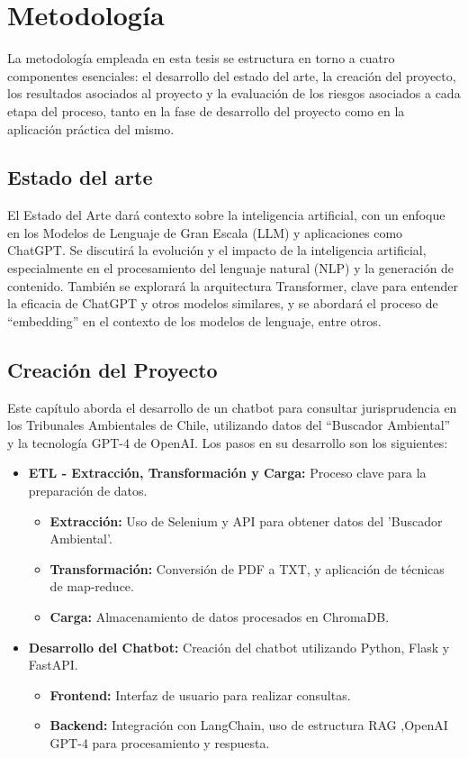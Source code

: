 \section{Metodología}

La metodología empleada en esta tesis se estructura en torno a cuatro componentes esenciales: 
el desarrollo del estado del arte, la creación del proyecto, los resultados asociados al proyecto y la evaluación de los riesgos asociados 
a cada etapa del proceso, tanto en la fase de desarrollo del proyecto como en la aplicación práctica del mismo.

\subsection{Estado del arte}
El Estado del Arte dará contexto sobre la inteligencia artificial, con un enfoque en los Modelos de Lenguaje de Gran Escala (LLM) 
y aplicaciones como ChatGPT. Se discutirá la evolución y el impacto de la inteligencia artificial, especialmente en el procesamiento 
del lenguaje natural (NLP) y la generación de contenido. También se explorará la arquitectura Transformer, clave para entender la 
eficacia de ChatGPT y otros modelos similares, y se abordará el proceso de ``embedding'' en el contexto de los modelos de lenguaje, entre otros.


\subsection{Creación del Proyecto}

Este capítulo aborda el desarrollo de un chatbot para consultar jurisprudencia en los Tribunales Ambientales de Chile, 
utilizando datos del ``Buscador Ambiental'' y la tecnología GPT-4 de OpenAI. Los pasos en su desarrollo son los siguientes:

\begin{itemize}
    \item \textbf{ETL - Extracción, Transformación y Carga:} Proceso clave para la preparación de datos.
    \begin{itemize}
        \item \textbf{Extracción:} Uso de Selenium y API para obtener datos del 'Buscador Ambiental'.
        \item \textbf{Transformación:} Conversión de PDF a TXT, y aplicación de técnicas de map-reduce.
        \item \textbf{Carga:} Almacenamiento de datos procesados en ChromaDB.
    \end{itemize}

    \item \textbf{Desarrollo del Chatbot:} Creación del chatbot utilizando Python, Flask y FastAPI.
    \begin{itemize}
        \item \textbf{Frontend:} Interfaz de usuario para realizar consultas.
        \item \textbf{Backend:} Integración con LangChain, uso de estructura RAG ,OpenAI GPT-4 para procesamiento y respuesta.
    \end{itemize}
\end{itemize}

